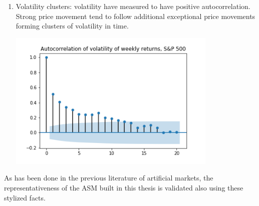 \begin{enumerate}
    \item Volatility clusters: volatility have measured to have positive autocorrelation. Strong price movement tend to follow additional exceptional price movements forming clusters of volatility in time.
    \par
    \begin{minipage}{\linewidth}
        \centering
        \includegraphics[width=10cm]{plots/S&P500_vola_autocorr.png}
    \end{minipage}
\end{enumerate} 


As has been done in the previous literature of artificial markets, the 
representativeness of the ASM built in this thesis is validated also 
using these stylized facts.